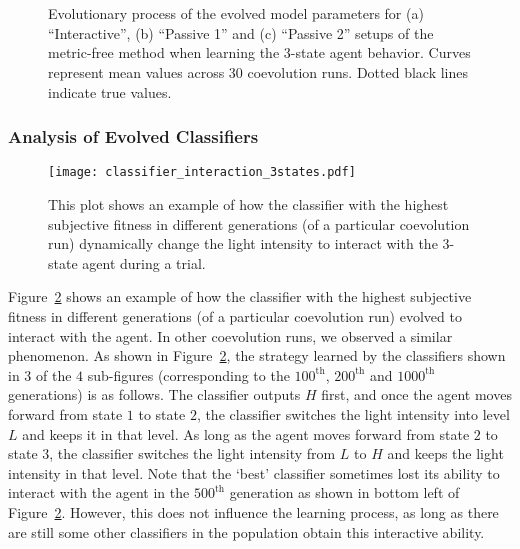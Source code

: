 \begin{figure}[!t]%
	\centering
		\\
		\\
		\caption{Evolutionary process of the evolved model parameters for (a) ``Interactive'', (b) ``Passive 1'' and (c) ``Passive 2'' setups of the metric-free method when learning the 3-state agent behavior. Curves represent mean values across 30 coevolution runs. Dotted black lines indicate true values.\label{fig:model_parameters_convergence_stochastic_3states}}
\end{figure}

\subsubsection{Analysis of Evolved Classifiers}
%
\begin{figure}[!t]
\centering
\texttt{[image: classifier\_interaction\_3states.pdf]}
\caption{This plot shows an example of how the classifier with the highest subjective fitness in different generations (of a particular coevolution run) dynamically change the light intensity to interact with the 3-state agent during a trial.}
\label{fig:classifier_interaction_3states}
\end{figure}
%

Figure~\ref{fig:classifier_interaction_3states} shows an example of how the classifier with the highest subjective fitness in different generations (of a particular coevolution run) evolved to interact with the agent. In other coevolution runs, we observed a similar phenomenon. As shown in Figure~\ref{fig:classifier_interaction_3states}, the strategy learned by the classifiers shown in $3$ of the $4$ sub-figures (corresponding to the $100^\mathrm{th}$, $200^\mathrm{th}$ and $1000^\mathrm{th}$ generations) is as follows. The classifier outputs $H$ first, and once the agent moves forward from state $1$ to state $2$, the classifier switches the light intensity into level $L$ and keeps it in that level. As long as the agent moves forward from state $2$ to state $3$, the classifier switches the light intensity from $L$ to $H$ and keeps the light intensity in that level. Note that the `best' classifier sometimes lost its ability to interact with the agent in the $500^\mathrm{th}$ generation as shown in bottom left of Figure~\ref{fig:classifier_interaction_3states}. However, this does not influence the learning process, as long as there are still some other classifiers in the population obtain this interactive ability. 

